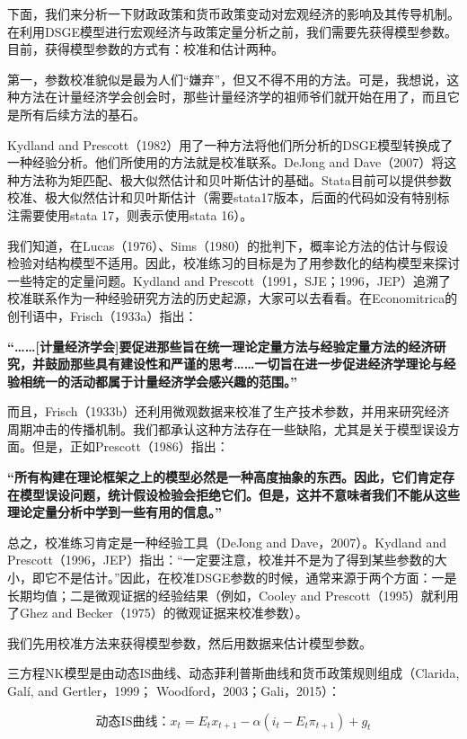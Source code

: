 \documentclass[cn,12pt,math=newtx,citestyle=gb7714-2015,bibstyle=gb7714-2015]{elegantbook}
\begin{document}
	下面，我们来分析一下财政政策和货币政策变动对宏观经济的影响及其传导机制。在利用DSGE模型进行宏观经济与政策定量分析之前，我们需要先获得模型参数。目前，获得模型参数的方式有：校准和估计两种。
	
	第一，参数校准貌似是最为人们“嫌弃”，但又不得不用的方法。可是，我想说，这种方法在计量经济学会创会时，那些计量经济学的祖师爷们就开始在用了，而且它是所有后续方法的基石。
	
	Kydland and Prescott（1982）用了一种方法将他们所分析的DSGE模型转换成了一种经验分析。他们所使用的方法就是校准联系。DeJong and Dave（2007）将这种方法称为矩匹配、极大似然估计和贝叶斯估计的基础。Stata目前可以提供参数校准、极大似然估计和贝叶斯估计（需要stata17版本，后面的代码如没有特别标注需要使用stata 17，则表示使用stata 16）。
	
	我们知道，在Lucas（1976）、Sims（1980）的批判下，概率论方法的估计与假设检验对结构模型不适用。因此，校准练习的目标是为了用参数化的结构模型来探讨一些特定的定量问题。Kydland and Prescott（1991，SJE；1996，JEP）追溯了校准联系作为一种经验研究方法的历史起源，大家可以去看看。在Economitrica的创刊语中，Frisch（1933a）指出：
	
	\textbf{“……[计量经济学会]要促进那些旨在统一理论定量方法与经验定量方法的经济研究，并鼓励那些具有建设性和严谨的思考……一切旨在进一步促进经济学理论与经验相统一的活动都属于计量经济学会感兴趣的范围。”}
	
	而且，Frisch（1933b）还利用微观数据来校准了生产技术参数，并用来研究经济周期冲击的传播机制。我们都承认这种方法存在一些缺陷，尤其是关于模型误设方面。但是，正如Prescott（1986）指出：
	
	\textbf{“所有构建在理论框架之上的模型必然是一种高度抽象的东西。因此，它们肯定存在模型误设问题，统计假设检验会拒绝它们。但是，这并不意味者我们不能从这些理论定量分析中学到一些有用的信息。”}
	
	总之，校准练习肯定是一种经验工具（DeJong and Dave，2007）。Kydland and Prescott（1996，JEP）指出：“一定要注意，校准并不是为了得到某些参数的大小，即它不是估计。”因此，在校准DSGE参数的时候，通常来源于两个方面：一是长期均值；二是微观证据的经验结果（例如，Cooley and Prescott（1995）就利用了Ghez and Becker（1975）的微观证据来校准参数）。
	
	我们先用校准方法来获得模型参数，然后用数据来估计模型参数。
	
	
	三方程NK模型是由动态IS曲线、动态菲利普斯曲线和货币政策规则组成（Clarida, Galí, and Gertler，1999； Woodford，2003；Gali，2015）：
	
	\begin{equation}
		\text{动态IS曲线：}x_t = E_t x_{t+1} - \alpha(i_t - E_t\pi_{t+1} )+ g_t
	\end{equation}
	
\end{document}
